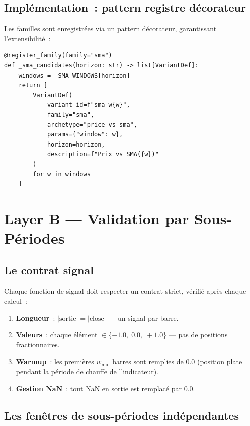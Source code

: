 \subsection{Implémentation~: pattern registre décorateur}

Les familles sont enregistrées via un pattern décorateur, garantissant
l'extensibilité~:

\begin{lstlisting}[caption={Pattern d'enregistrement des familles d'indicateurs (Layer A)},label={lst:register_family}]
@register_family(family="sma")
def _sma_candidates(horizon: str) -> list[VariantDef]:
    windows = _SMA_WINDOWS[horizon]
    return [
        VariantDef(
            variant_id=f"sma_w{w}",
            family="sma",
            archetype="price_vs_sma",
            params={"window": w},
            horizon=horizon,
            description=f"Prix vs SMA({w})"
        )
        for w in windows
    ]
\end{lstlisting}

\section{Layer B --- Validation par Sous-Périodes}
\label{sec:layer_b}

\subsection{Le contrat signal}

Chaque fonction de signal doit respecter un contrat strict, vérifié après chaque
calcul~:

\begin{enumerate}
    \item \textbf{Longueur}~: $|\text{sortie}| = |\text{close}|$ — un signal par barre.
    \item \textbf{Valeurs}~: chaque élément $\in \{-1.0,\; 0.0,\; +1.0\}$ — pas de
    positions fractionnaires.
    \item \textbf{Warmup}~: les premières $w_{\min}$ barres sont remplies de $0.0$
    (position plate pendant la période de chauffe de l'indicateur).
    \item \textbf{Gestion NaN}~: tout NaN en sortie est remplacé par $0.0$.
\end{enumerate}

\subsection{Les fenêtres de sous-périodes indépendantes}

